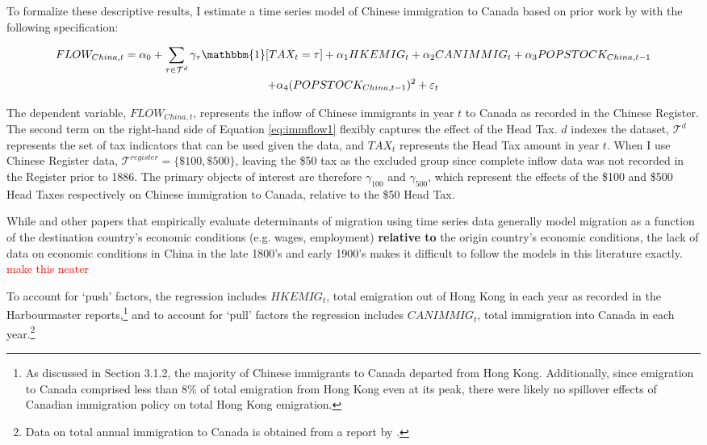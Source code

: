To formalize these descriptive results, I estimate a time series model of Chinese immigration to Canada based on prior work by \citet{hattonwilliamson1994,boustan2007,Clarketal2007} with the following specification:

\begin{multline}
    \label{eq:immflow1}
    FLOW_{China,t} = \alpha_0 + \sum_{\tau \in \mathcal{T}^d} \gamma_\tau \mathbbm{1}[TAX_t = \tau] + \alpha_1 HKEMIG_t + \alpha_2 CANIMMIG_t + \alpha_3 POPSTOCK_{China, t-1} \\ + \alpha_4 (POPSTOCK_{China, t-1})^2 + \varepsilon_t
\end{multline}

The dependent variable, $FLOW_{China,t}$, represents the inflow of Chinese immigrants in year $t$ to Canada as recorded in the Chinese Register. The second term on the right-hand side of Equation \ref{eq:immflow1} flexibly captures the effect of the Head Tax. $d$ indexes the dataset, $\mathcal{T}^d$ represents the set of tax indicators that can be used given the data, and $TAX_t$ represents the Head Tax amount in year $t$. When I use Chinese Register data, $\mathcal{T}^{register} = \{\$100,\$500\}$, leaving the \$50 tax as the excluded group since complete inflow data was not recorded in the Register prior to 1886. The primary objects of interest are therefore $\gamma_{100}$ and $\gamma_{500}$, which represent the effects of the \$100 and \$500 Head Taxes respectively on Chinese immigration to Canada, relative to the \$50 Head Tax.

While \citet{hattonwilliamson1994,boustan2007,Clarketal2007} and other papers that empirically evaluate determinants of migration using time series data generally model migration as a function of the destination country's economic conditions (e.g. wages, employment) \textbf{relative to} the origin country's economic conditions, the lack of data on economic conditions in China in the late 1800's and early 1900's makes it difficult to follow the models in this literature exactly. \textcolor{red}{make this neater} 


To account for `push' factors, the regression includes $HKEMIG_t$, total emigration out of Hong Kong in each year as recorded in the Harbourmaster reports,\footnote{As discussed in Section 3.1.2, the majority of Chinese immigrants to Canada departed from Hong Kong. Additionally, since emigration to Canada comprised less than 8\% of total emigration from Hong Kong even at its peak, there were likely no spillover effects of Canadian immigration policy on total Hong Kong emigration.} and to account for `pull' factors the regression includes $CANIMMIG_t$, total immigration into Canada in each year.\footnote{Data on total annual immigration to Canada is obtained from a report by \citet{canimm}.}

